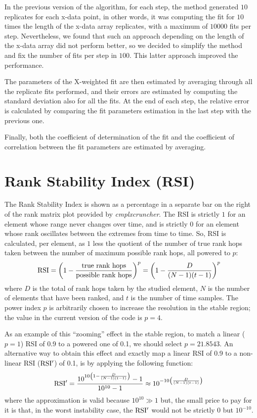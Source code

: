 \documentclass[12pt,oneside,letterpaper]{article}
\newcommand{\CC}[0]{\emph{cmplxcruncher}}
\begin{document}
In the previous version of the algorithm, for each step, the method generated $10$ replicates for each x-data point, in other words, it was computing the fit for $10$ times the length of the x-data array replicates, with a maximum of $10000$ fits per step. Nevertheless, we found that such an approach depending on the length of the x-data array did not perform better, so we decided to simplify the method and fix the number of fits per step in $100$. This latter approach improved the performance. 

The parameters of the X-weighted fit are then estimated by averaging through all the replicate fits performed, and their errors are estimated by computing the standard deviation also for all the fits. At the end of each step, the relative error is calculated by comparing the fit parameters estimation in the last step with the previous one.

Finally, both the coefficient of determination of the fit and the coefficient of correlation between the fit parameters are estimated by averaging.

\section{Rank Stability Index (RSI)}\label{sec:RSI}

The Rank Stability Index is shown as a percentage in a separate bar on the right of the rank matrix plot provided by \CC. The RSI is strictly $1$ for an element whose range never changes over time, and is strictly $0$ for an element whose rank oscillates between the extremes from time to time. So, RSI is calculated, per element, as $1$ less the quotient of the number of true rank hops taken between the number of maximum possible rank hops, all powered to $p$:
$${\rm RSI} = \left(1-\frac{\text{true rank hops}}{\text{possible rank hops}}\right)^p = \left(1-\frac{D}{(N-1)(t-1)}\right)^p$$
where $D$ is the total of rank hops taken by the studied element, $N$ is the number of elements that have been ranked, and $t$ is the number of time samples. The power index $p$ is arbitrarily chosen to increase the resolution in the stable region; the value in the current version of the code is $p=4$. 

As an example of this ``zooming'' effect in the stable region, to match a linear ($p=1$) RSI of 0.9 to a powered one of 0.1, we should select $p=21.8543$. An alternative way to obtain this effect and exactly map a linear RSI of 0.9 to a non-linear RSI (${\rm RSI'}$) of 0.1, is by applying the following function:
$${\rm RSI'} = \frac{10^{10\left(1-\frac{D}{(N-1)(t-1)}\right)}-1}{10^{10}-1} \approx 10^{-10\left(\frac{D}{(N-1)(t-1)}\right)} $$
where the approximation is valid because $10^{10}\gg 1$ but, the small price to pay for it is that, in the worst instability case, the ${\rm RSI'}$ would not be strictly $0$ but $10^{-10}$.
\end{document}
